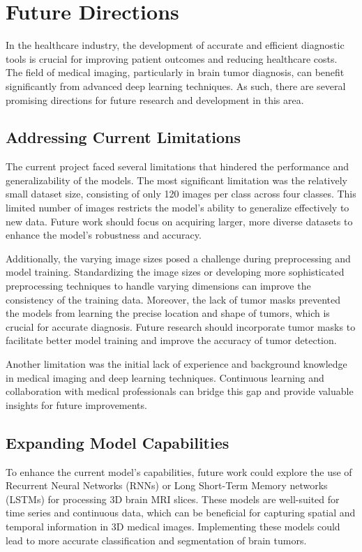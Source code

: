 \section{Future Directions}\label{Future_Directions}

In the healthcare industry, the development of accurate and efficient diagnostic tools is crucial for improving patient outcomes and reducing healthcare costs. The field of medical imaging, particularly in brain tumor diagnosis, can benefit significantly from advanced deep learning techniques. As such, there are several promising directions for future research and development in this area.

\subsection{Addressing Current Limitations}

The current project faced several limitations that hindered the performance and generalizability of the models. The most significant limitation was the relatively small dataset size, consisting of only 120 images per class across four classes. This limited number of images restricts the model's ability to generalize effectively to new data. Future work should focus on acquiring larger, more diverse datasets to enhance the model's robustness and accuracy.

Additionally, the varying image sizes posed a challenge during preprocessing and model training. Standardizing the image sizes or developing more sophisticated preprocessing techniques to handle varying dimensions can improve the consistency of the training data. Moreover, the lack of tumor masks prevented the models from learning the precise location and shape of tumors, which is crucial for accurate diagnosis. Future research should incorporate tumor masks to facilitate better model training and improve the accuracy of tumor detection.

Another limitation was the initial lack of experience and background knowledge in medical imaging and deep learning techniques. Continuous learning and collaboration with medical professionals can bridge this gap and provide valuable insights for future improvements.

\subsection{Expanding Model Capabilities}

To enhance the current model's capabilities, future work could explore the use of Recurrent Neural Networks (RNNs) or Long Short-Term Memory networks (LSTMs) for processing 3D brain MRI slices. These models are well-suited for time series and continuous data, which can be beneficial for capturing spatial and temporal information in 3D medical images. Implementing these models could lead to more accurate classification and segmentation of brain tumors.

